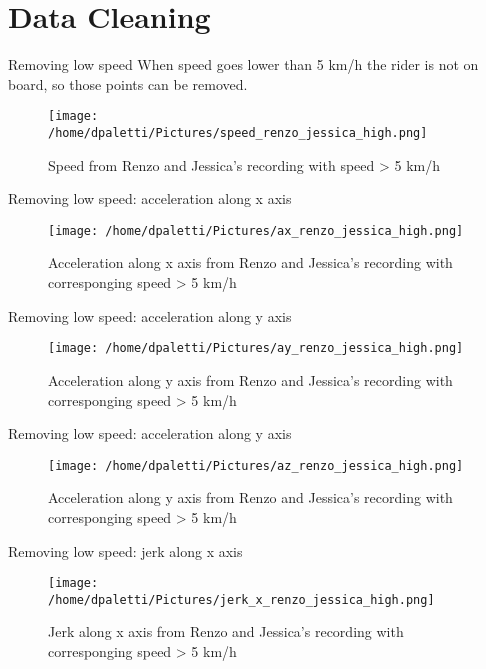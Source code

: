 \documentclass[presentation]{beamer}
\begin{document}
\section{Data Cleaning}
\label{sec:org4d610e8}
\begin{frame}[label={sec:org4e016e9}]{Removing low speed}
When speed goes lower than 5 km/h the \alert{rider is not on board}, so those points can be removed.
\begin{figure}[htbp]
\centering
\texttt{[image: /home/dpaletti/Pictures/speed\_renzo\_jessica\_high.png]}
\caption{\label{fig:speed_alberto_jessica}Speed from Renzo and Jessica's recording with speed > 5 km/h}
\end{figure}
\end{frame}
\begin{frame}[label={sec:org3f8a7e5}]{Removing low speed: acceleration along x axis}
\begin{figure}[htbp]
\centering
\texttt{[image: /home/dpaletti/Pictures/ax\_renzo\_jessica\_high.png]}
\caption{\label{fig:speed_alberto_jessica}Acceleration along x axis from Renzo and Jessica's recording with corresponging speed > 5 km/h}
\end{figure}
\end{frame}
\begin{frame}[label={sec:org2f07b34}]{Removing low speed: acceleration along y axis}
\begin{figure}[htbp]
\centering
\texttt{[image: /home/dpaletti/Pictures/ay\_renzo\_jessica\_high.png]}
\caption{\label{fig:speed_alberto_jessica}Acceleration along y axis from Renzo and Jessica's recording with corresponging speed > 5 km/h}
\end{figure}
\end{frame}
\begin{frame}[label={sec:org4e1b629}]{Removing low speed: acceleration along y axis}
\begin{figure}[htbp]
\centering
\texttt{[image: /home/dpaletti/Pictures/az\_renzo\_jessica\_high.png]}
\caption{\label{fig:speed_alberto_jessica}Acceleration along y axis from Renzo and Jessica's recording with corresponging speed > 5 km/h}
\end{figure}
\end{frame}
\begin{frame}[label={sec:org45b0299}]{Removing low speed: jerk along x axis}
\begin{figure}[htbp]
\centering
\texttt{[image: /home/dpaletti/Pictures/jerk\_x\_renzo\_jessica\_high.png]}
\caption{\label{fig:speed_alberto_jessica}Jerk along x axis from Renzo and Jessica's recording with corresponging speed > 5 km/h}
\end{figure}
\end{frame}
\end{document}
